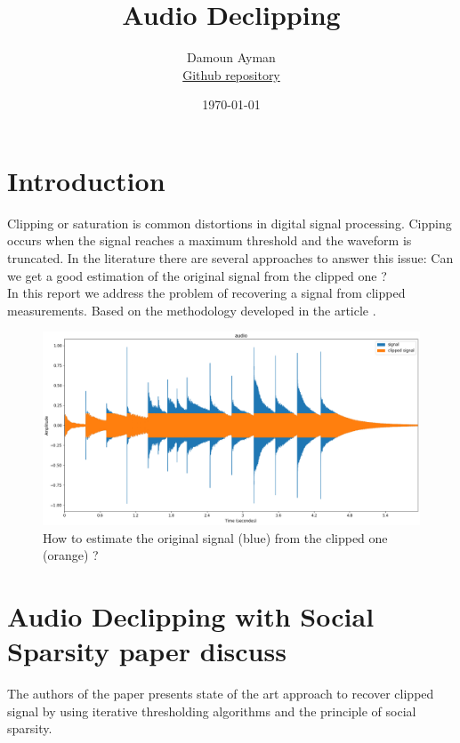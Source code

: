 \documentclass{article}
\title{Audio Declipping} %
\author{Damoun Ayman \\ \href{https://github.com/damounayman/signal_processing}{\small Github repository}} %
\date{\today} %
\numberwithin{dummy}{section}
\begin{document}
\maketitle %
\section{Introduction}
Clipping or saturation is  common  distortions in  digital signal  processing. Cipping occurs when the signal reaches a maximum threshold and the waveform is truncated. In the literature there are several approaches to answer this issue: Can we get a good estimation of the original signal from the clipped one ?\\
In  this  report   we  address  the  problem  of recovering a signal from clipped measurements. Based on the methodology developed in the article \cite{inproceedings}.
\begin{figure}[ht!]
    \centering
    \includegraphics[scale=0.3]{figures/cvd.png}
    \caption{How to estimate the original signal (blue) from the clipped one (orange) ?}
    \label{reff}
\end{figure}
\section{Audio Declipping with Social Sparsity paper discuss}
The authors of the paper \cite{inproceedings} presents state of the art approach to recover clipped signal by using iterative thresholding algorithms and the principle of social sparsity.
\end{document}
